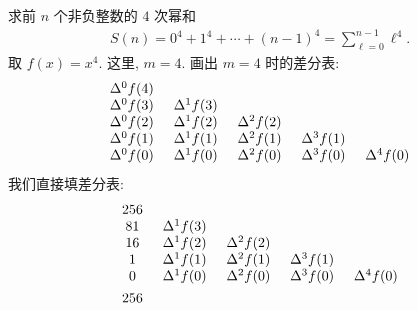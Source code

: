 \begin{example}
    求前 $n$ 个非负整数的 $4$ 次幂和
    \begin{align*}
        S(n) = 0^4 + 1^4 + \cdots + (n-1)^4 = \sum_{\ell = 0}^{n - 1} \ell^4.
    \end{align*}
    取 $f(x) = x^4$. 这里, $m = 4$. 画出 $m = 4$ 时的差分表:
    \begin{align*}
        \arraycolsep=0.25cm
        \begin{array}{ccccc}
            \Delta^{0} f(4) & \               & \               & \               & \               \\
            \Delta^{0} f(3) & \Delta^{1} f(3) & \               & \               & \               \\
            \Delta^{0} f(2) & \Delta^{1} f(2) & \Delta^{2} f(2) & \               & \               \\
            \Delta^{0} f(1) & \Delta^{1} f(1) & \Delta^{2} f(1) & \Delta^{3} f(1) & \               \\
            \Delta^{0} f(0) & \Delta^{1} f(0) & \Delta^{2} f(0) & \Delta^{3} f(0) & \Delta^{4} f(0) \\
        \end{array}
    \end{align*}
    我们直接填差分表:
    \begin{align*}
         & {
                \arraycolsep=0.25cm
                \begin{array}{ccccc}
                    256 & \               & \               & \               & \               \\
                    81  & \Delta^{1} f(3) & \               & \               & \               \\
                    16  & \Delta^{1} f(2) & \Delta^{2} f(2) & \               & \               \\
                    1   & \Delta^{1} f(1) & \Delta^{2} f(1) & \Delta^{3} f(1) & \               \\
                    0   & \Delta^{1} f(0) & \Delta^{2} f(0) & \Delta^{3} f(0) & \Delta^{4} f(0) \\
                \end{array}
        }    \\
         & {
                \arraycolsep=0.25cm
                \begin{array}{ccccc}
                    256 & \   & \               & \               & \               \\

\end{array}}
\end{align*}
\end{example}
